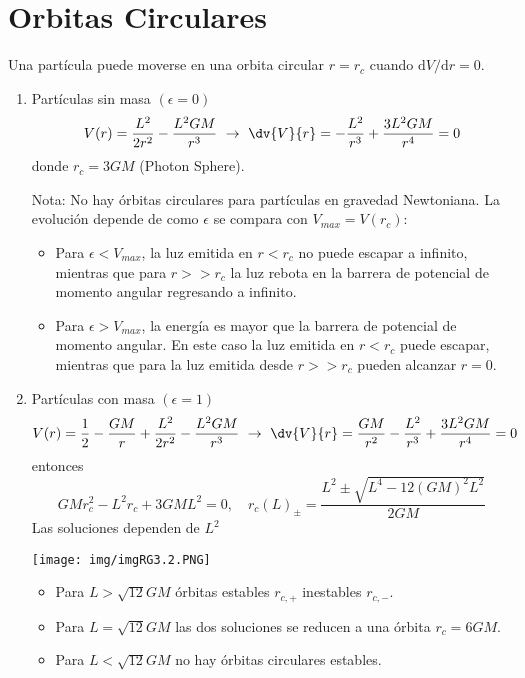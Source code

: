 \documentclass[../main]{subfiles}
\begin{document}
\section{Orbitas Circulares}

Una partícula puede moverse en una orbita circular $r=r_c$ cuando $\mathrm{d}V/\mathrm{d}r=0$.
\begin{enumerate}
    \item Partículas sin masa $(\epsilon=0)$
    \begin{equation}
        V(r)=\dfrac{L^2}{2r^2}-\dfrac{L^2 GM}{r^3} \ \rightarrow \ \dv{V}{r}=-\dfrac{L^2}{r^3}+\dfrac{3L^2 GM}{r^4}=0
    \end{equation}
    donde $r_c=3GM$ (Photon Sphere).

    Nota: No hay órbitas circulares para partículas en gravedad Newtoniana. La evolución depende de como $\epsilon$ se compara con $V_{max}=V(r_c)$:
    \begin{itemize}
        \item Para $\epsilon<V_{max}$, la luz emitida en $r<r_c$ no puede escapar a infinito, mientras que para $r>>r_c$ la luz rebota en la barrera de potencial de momento angular regresando a infinito.
        \item Para $\epsilon>V_{max}$, la energía es mayor que la barrera de potencial de momento angular. En este caso la luz emitida en $r<r_c$ puede escapar, mientras que para la luz emitida desde $r>>r_c$ pueden alcanzar $r=0$.
    \end{itemize}
    \item Partículas con masa $(\epsilon=1)$
    \begin{equation}
        V(r)=\dfrac{1}{2}-\dfrac{GM}{r}+\dfrac{L^2}{2r^2}-\dfrac{L^2 GM}{r^3} \ \rightarrow \ \dv{V}{r}=\dfrac{GM}{r^2}-\dfrac{L^2}{r^3}+\dfrac{3L^2 GM}{r^4}=0
    \end{equation}
    entonces 
    \begin{equation}
        GMr^2_c-L^2 r_c+3GML^2=0,\quad r_c(L)_{\pm}=\dfrac{L^2 \pm \sqrt{L^4-12(GM)^2L^2}}{2GM}
    \end{equation}
    Las soluciones dependen de $L^2$

    \begin{minipage}{0.5\textwidth}
        \begin{center}
            \texttt{[image: img/imgRG3.2.PNG]}
        \end{center}
    \end{minipage}
    \begin{minipage}{0.5\textwidth}
        \begin{itemize}
            \item Para $L>\sqrt{12}GM$ órbitas estables $r_{c,+}$ inestables $r_{c,-}$.
            \item Para $L=\sqrt{12}GM$ las dos soluciones se reducen a una órbita $r_c=6GM$.
            \item Para $L<\sqrt{12}GM$ no hay órbitas circulares estables.
        \end{itemize}
    \end{minipage}
\end{enumerate}
\end{document}
